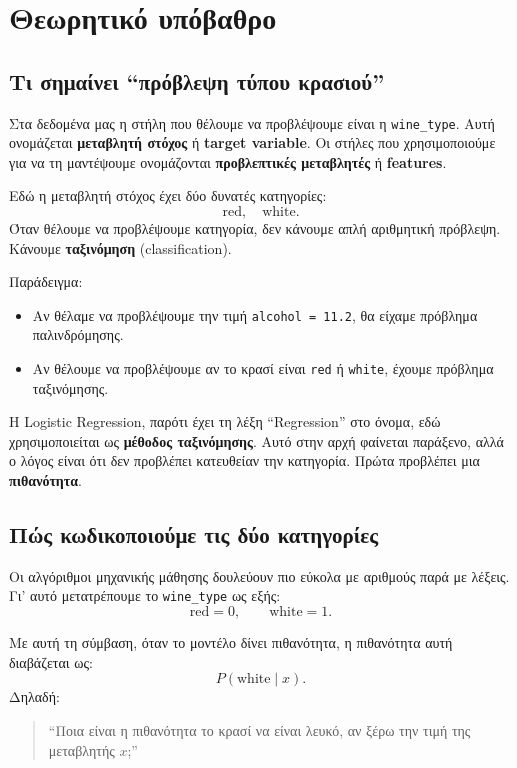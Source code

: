 \documentclass[11pt,a4paper]{article}
\newcommand{\code}[1]{\texttt{#1}}
\newcommand{\eng}[1]{\textenglish{#1}}
\begin{document}
\section{Θεωρητικό υπόβαθρο}

\subsection{Τι σημαίνει ``πρόβλεψη τύπου κρασιού''}

Στα δεδομένα μας η στήλη που θέλουμε να προβλέψουμε είναι η \code{wine\_type}.
Αυτή ονομάζεται \textbf{μεταβλητή στόχος} ή \textbf{target variable}. Οι
στήλες που χρησιμοποιούμε για να τη μαντέψουμε ονομάζονται
\textbf{προβλεπτικές μεταβλητές} ή \textbf{features}.

Εδώ η μεταβλητή στόχος έχει δύο δυνατές κατηγορίες:
\[
\text{red}, \quad \text{white}.
\]
Όταν θέλουμε να προβλέψουμε κατηγορία, δεν κάνουμε απλή αριθμητική πρόβλεψη.
Κάνουμε \textbf{ταξινόμηση} (\eng{classification}).

Παράδειγμα:
\begin{itemize}
    \item Αν θέλαμε να προβλέψουμε την τιμή \code{alcohol = 11.2}, θα είχαμε
    πρόβλημα παλινδρόμησης.
    \item Αν θέλουμε να προβλέψουμε αν το κρασί είναι \code{red} ή
    \code{white}, έχουμε πρόβλημα ταξινόμησης.
\end{itemize}

Η Logistic Regression, παρότι έχει τη λέξη ``Regression'' στο όνομα, εδώ
χρησιμοποιείται ως \textbf{μέθοδος ταξινόμησης}. Αυτό στην αρχή φαίνεται
παράξενο, αλλά ο λόγος είναι ότι δεν προβλέπει κατευθείαν την κατηγορία.
Πρώτα προβλέπει μια \textbf{πιθανότητα}.

\subsection{Πώς κωδικοποιούμε τις δύο κατηγορίες}

Οι αλγόριθμοι μηχανικής μάθησης δουλεύουν πιο εύκολα με αριθμούς παρά με
λέξεις. Γι' αυτό μετατρέπουμε το \code{wine\_type} ως εξής:
\[
\text{red} = 0, \qquad \text{white} = 1.
\]

Με αυτή τη σύμβαση, όταν το μοντέλο δίνει πιθανότητα, η πιθανότητα αυτή
διαβάζεται ως:
\[
P(\text{white} \mid x).
\]
Δηλαδή:
\begin{quote}
``Ποια είναι η πιθανότητα το κρασί να είναι λευκό, αν ξέρω την τιμή της
μεταβλητής \(x\);''
\end{quote}
\end{document}

